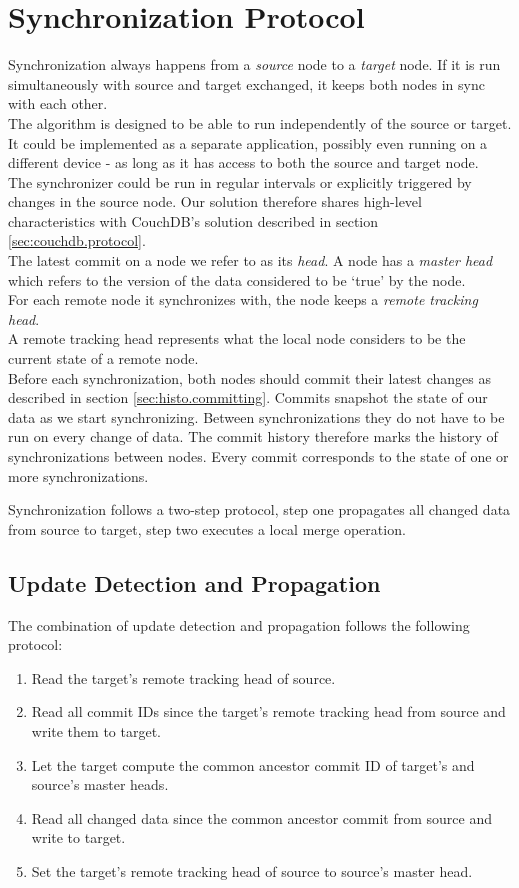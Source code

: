 
\section{Synchronization Protocol}
\label{sec:histo.protocol}
Synchronization always happens from a \emph{source} node to a \emph{target} node.
If it is run simultaneously with source and target exchanged, it keeps both nodes in sync with each other.\\
The algorithm is designed to be able to run independently of the source or target.
It could be implemented as a separate application, possibly even running on a different device - as long as it has access to both the source and target node.\\
The synchronizer could be run in regular intervals or explicitly triggered by changes in the source node.
Our solution therefore shares high-level characteristics with CouchDB's solution described in section \ref{sec:couchdb.protocol}.\\

The latest commit on a node we refer to as its \emph{head}.
A node has a \emph{master head} which refers to the version of the data considered to be `true' by the node.\\
For each remote node it synchronizes with, the node keeps a \emph{remote tracking head}.\\
A remote tracking head represents what the local node considers to be the current state of a remote node.\\
Before each synchronization, both nodes should commit their latest changes as described in section \ref{sec:histo.committing}.
Commits snapshot the state of our data as we start synchronizing.
Between synchronizations they do not have to be run on every change of data.
The commit history therefore marks the history of synchronizations between nodes.
Every commit corresponds to the state of one or more synchronizations.

Synchronization follows a two-step protocol, step one propagates all changed data from source to target, step two executes a local merge operation.

\subsection{Update Detection and Propagation}
\label{sec:histo.protocol.detection-propagation}
The combination of update detection and propagation follows the following protocol:

\begin{enumerate}
\item Read the target's remote tracking head of source.
\item Read all commit IDs since the target's remote tracking head from source and write them to target.
\item Let the target compute the common ancestor commit ID of target's and source's master heads.
\item Read all changed data since the common ancestor commit from source and write to target.
\item Set the target's remote tracking head of source to source's master head.
\end{enumerate}

